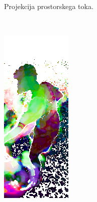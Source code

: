 \begin{figure}[!htb]
\begin{subfigure}[t]{0.3\columnwidth}
		\caption{Projekcija prostorskega toka.}
		\label{fig:stage2-field-pd}
	\end{subfigure}
	~
	\begin{subfigure}[t]{0.3\columnwidth}
		\centering
		\includegraphics[width=\columnwidth, frame]{./Slike/stage2-field-sf-pd-tr-corrected.jpg}

\end{subfigure}
\end{figure}
